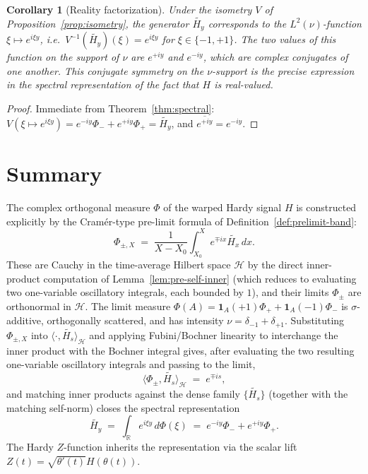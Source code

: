 \documentclass[11pt]{article}
\newtheorem{corollary}[theorem]{Corollary}
\theoremstyle{definition}
\theoremstyle{remark}
\begin{document}
\begin{corollary}[Reality factorization]\label{cor:reality}
Under the isometry $V$ of Proposition~\ref{prop:isometry}, the generator $\widetilde{H_y}$ corresponds to the $L^2(\nu)$-function $\xi\mapsto e^{i\xi y}$, i.e.\ $V^{-1}(\widetilde{H_y})(\xi)=e^{i\xi y}$ for $\xi\in\{-1,+1\}$. The two values of this function on the support of $\nu$ are $e^{+iy}$ and $e^{-iy}$, which are complex conjugates of one another. This conjugate symmetry on the $\nu$-support is the precise expression in the spectral representation of the fact that $H$ is real-valued.
\end{corollary}

\begin{proof}
Immediate from Theorem~\ref{thm:spectral}: $V(\xi\mapsto e^{i\xi y})=e^{-iy}\Phi_-+e^{+iy}\Phi_+=\widetilde{H_y}$, and $\overline{e^{+iy}}=e^{-iy}$.
\end{proof}

\section{Summary}

The complex orthogonal measure $\Phi$ of the warped Hardy signal $H$ is constructed explicitly by the Cram\'er-type pre-limit formula of Definition~\ref{def:prelimit-band}: 
\[
  \Phi_{\pm,X}\;=\;\frac{1}{X-X_0}\int_{X_0}^X e^{\mp ix}\widetilde{H_x}\,dx.
\]
These are Cauchy in the time-average Hilbert space $\mathcal{H}$ by the direct inner-product computation of Lemma~\ref{lem:pre-self-inner} (which reduces to evaluating two one-variable oscillatory integrals, each bounded by $1$), and their limits $\Phi_\pm$ are orthonormal in $\mathcal{H}$. The limit measure $\Phi(A)=\mathbf{1}_A(+1)\Phi_++\mathbf{1}_A(-1)\Phi_-$ is $\sigma$-additive, orthogonally scattered, and has intensity $\nu=\delta_{-1}+\delta_{+1}$. Substituting $\Phi_{\pm,X}$ into $\langle\cdot,\widetilde{H_s}\rangle_\mathcal{H}$ and applying Fubini/Bochner linearity to interchange the inner product with the Bochner integral gives, after evaluating the two resulting one-variable oscillatory integrals and passing to the limit,
\[
  \langle\Phi_\pm,\widetilde{H_s}\rangle_\mathcal{H}\;=\;e^{\mp is},
\]
and matching inner products against the dense family $\{\widetilde{H_s}\}$ (together with the matching self-norm) closes the spectral representation
\[
  \widetilde{H_y}\;=\;\int_{\mathbb{R}} e^{i\xi y}\,d\Phi(\xi)\;=\;e^{-iy}\Phi_-+e^{+iy}\Phi_+.
\]
The Hardy $Z$-function inherits the representation via the scalar lift $Z(t)=\sqrt{\theta'(t)}H(\theta(t))$.
\end{document}
